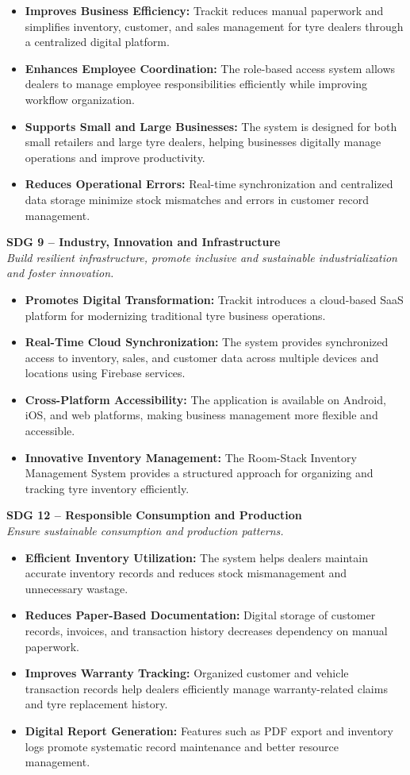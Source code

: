 \documentclass[12pt, oneside]{article}
\begin{document}
\begin{itemize}
    \item \textbf{Improves Business Efficiency:} Trackit reduces manual paperwork and simplifies inventory, customer, and sales management for tyre dealers through a centralized digital platform.
    \item \textbf{Enhances Employee Coordination:} The role-based access system allows dealers to manage employee responsibilities efficiently while improving workflow organization.
    \item \textbf{Supports Small and Large Businesses:} The system is designed for both small retailers and large tyre dealers, helping businesses digitally manage operations and improve productivity.
    \item \textbf{Reduces Operational Errors:} Real-time synchronization and centralized data storage minimize stock mismatches and errors in customer record management.
\end{itemize}
\textbf{SDG 9 – Industry, Innovation and Infrastructure} \\
\textit{Build resilient infrastructure, promote inclusive and sustainable industrialization and foster innovation.}
\begin{itemize}
    \item \textbf{Promotes Digital Transformation:} Trackit introduces a cloud-based SaaS platform for modernizing traditional tyre business operations.
    \item \textbf{Real-Time Cloud Synchronization:} The system provides synchronized access to inventory, sales, and customer data across multiple devices and locations using Firebase services.
    \item \textbf{Cross-Platform Accessibility:} The application is available on Android, iOS, and web platforms, making business management more flexible and accessible.
    \item \textbf{Innovative Inventory Management:} The Room-Stack Inventory Management System provides a structured approach for organizing and tracking tyre inventory efficiently.
\end{itemize}
\textbf{SDG 12 – Responsible Consumption and Production} \\
\textit{Ensure sustainable consumption and production patterns.}
\begin{itemize}
    \item \textbf{Efficient Inventory Utilization:} The system helps dealers maintain accurate inventory records and reduces stock mismanagement and unnecessary wastage.
    \item \textbf{Reduces Paper-Based Documentation:} Digital storage of customer records, invoices, and transaction history decreases dependency on manual paperwork.
    \item \textbf{Improves Warranty Tracking:} Organized customer and vehicle transaction records help dealers efficiently manage warranty-related claims and tyre replacement history.
    \item \textbf{Digital Report Generation:} Features such as PDF export and inventory logs promote systematic record maintenance and better resource management.
\end{itemize}
\end{document}
